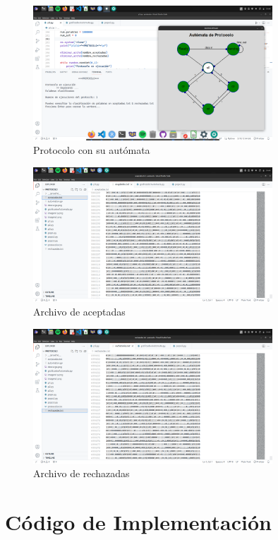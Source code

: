 \documentclass[11pt]{article} %
\begin{document}
	
	
	\begin{figure}[h]
		\centering
		\includegraphics[width=0.8\textwidth]{imagen1.png}
		\caption{Protocolo con su autómata}
	\end{figure}
	
	\begin{figure}[h]
		\centering
		\includegraphics[width=0.8\textwidth]{imagen2.png}
		\caption{Archivo de aceptadas}
	\end{figure}
	
	\begin{figure}[h]
		\centering
		\includegraphics[width=0.8\textwidth]{hola.png}
		\caption{Archivo de rechazadas}
	\end{figure}
	
	
	\section{Código de Implementación}
	
\end{document}
